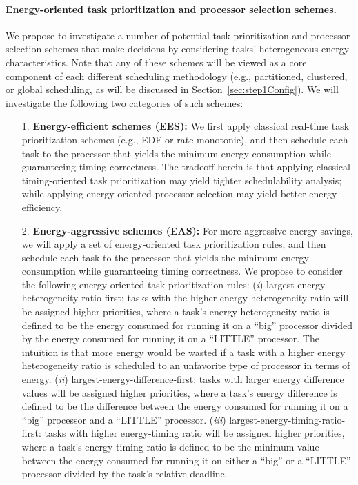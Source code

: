 \paragraph{Energy-oriented task prioritization and processor selection schemes.} We propose to investigate a number of potential task prioritization and processor selection schemes that make decisions by considering tasks' heterogeneous energy characteristics. Note that any of these schemes will be viewed as a core component of each different scheduling methodology (e.g., partitioned, clustered, or global scheduling, as will be discussed  in Section~\ref{sec:step1Config}). We will investigate the following two categories of such schemes:

\begin{itemize}\itemsep 0pt \parskip 0pt
\item[1.] \textbf{Energy-efficient schemes (EES):} We first apply classical real-time task prioritization schemes (e.g., EDF or rate monotonic), and then schedule each task to the processor that yields the minimum energy consumption while guaranteeing timing correctness. The tradeoff herein is that applying classical timing-oriented task prioritization may yield tighter schedulability analysis; while applying energy-oriented processor selection may yield better energy efficiency.
\item[2.] \textbf{Energy-aggressive schemes (EAS):} For more aggressive energy savings, we will apply a set of energy-oriented task prioritization rules, and then schedule each task to the processor that yields the minimum energy consumption while guaranteeing timing correctness. We propose to consider the following energy-oriented task prioritization rules: (\textit{i}) largest-energy-heterogeneity-ratio-first: tasks with the higher energy heterogeneity ratio will be assigned higher priorities, where a task's energy heterogeneity ratio is defined to be  the energy consumed for running it on a ``big'' processor divided by the energy consumed for running it on a ``LITTLE'' processor. The intuition is that more energy would be wasted if a task with a higher energy heterogeneity ratio is scheduled to an unfavorite type of processor in terms of energy. (\textit{ii}) largest-energy-difference-first: tasks with larger energy difference values will be assigned higher priorities, where a task's energy difference is defined to be the difference between the energy consumed for running it on a ``big'' processor and a ``LITTLE'' processor. (\textit{iii}) largest-energy-timing-ratio-first: tasks with higher energy-timing ratio will be assigned higher priorities, where a task's energy-timing ratio is defined to be the minimum value between the energy consumed for running it on either a ``big'' or a ``LITTLE'' processor divided by the task's relative deadline.
\end{itemize}

